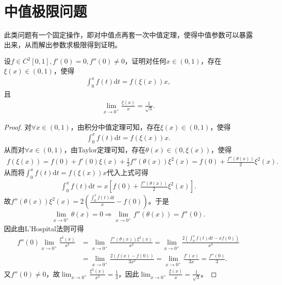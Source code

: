 \documentclass[../../main.tex]{subfiles}
\begin{document}
\section{中值极限问题}

此类问题有一个固定操作，即对中值点再套一次中值定理，使得中值参数可以暴露出来，从而解出参数求极限得到证明。

\begin{example}
设$f\in C^2[0,1],f'(0)=0,f''(0)\neq 0$，证明对任何$x\in(0,1)$，存在$\xi(x)\in(0,1)$，使得
\begin{align*}
\int_0^x f(t)\mathrm{d}t = f(\xi(x))x,
\end{align*}
且
\begin{align*}
\lim_{x\to 0^+}\frac{\xi(x)}{x}=\frac{1}{\sqrt{3}}.
\end{align*} 
\end{example}
\begin{proof}
对$\forall x\in(0,1)$，由积分中值定理可知，存在$\xi(x)\in(0,1)$，使得
\begin{align*}
\int_0^x f(t) \mathrm{d}t = f(\xi(x))x.
\end{align*}
从而对$\forall x\in(0,1)$，由Taylor定理可知，存在$\theta(x)\in(0,\xi(x))$，使得
\begin{align*}
f(\xi(x)) = f(0) + f'(0)\xi(x) + \frac{1}{2}f''(\theta(x))\xi^2(x) = f(0) + \frac{f''(\theta(x))}{2}\xi^2(x).
\end{align*}
从而将$\int_0^x f(t)\mathrm{d}t = f(\xi(x))x$代入上式可得
\begin{align*}
\int_0^x f(t)\mathrm{d}t = x\left[f(0) + \frac{f''(\theta(x))}{2}\xi^2(x)\right].
\end{align*}
故$f''(\theta(x))\xi^2(x) = 2\left(\frac{\int_0^x f(t)\mathrm{d}t}{x} - f(0)\right)$。于是
\begin{align*}
\lim_{x\to 0^+}\theta(x) = 0 \Rightarrow \lim_{x\to 0^+}f''(\theta(x)) = f''(0).
\end{align*}
因此由L'Hospital法则可得
\begin{align*}
f''(0)\lim_{x\to 0^+}\frac{\xi^2(x)}{x^2} &= \lim_{x\to 0^+}\frac{f''(\theta(x))\xi^2(x)}{x^2} = \lim_{x\to 0^+}\frac{2\left(\int_0^x f(t)\mathrm{d}t - xf(0)\right)}{x^3}\\
&= \lim_{x\to 0^+}\frac{2\left(f(x) - f(0)\right)}{3x^2} = \lim_{x\to 0^+}\frac{f'(x)}{3x} = \frac{f''(0)}{3}.
\end{align*}
又$f''(0)\neq 0$，故$\lim_{x\to 0^+}\frac{\xi^2(x)}{x^2} = \frac{1}{3}$，因此$\lim_{x\to 0^+}\frac{\xi(x)}{x} = \frac{1}{\sqrt{3}}$。 
\end{proof}
\end{document}
